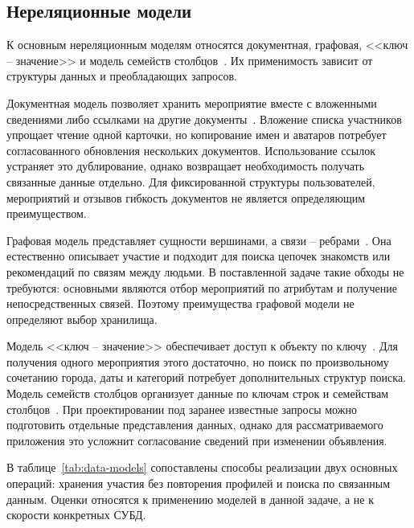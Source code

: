 \subsection{Нереляционные модели}

К основным нереляционным моделям относятся документная, графовая, <<ключ -- значение>> и модель семейств столбцов~\cite{database-types}. Их применимость зависит от структуры данных и преобладающих запросов.

Документная модель позволяет хранить мероприятие вместе с вложенными сведениями либо ссылками на другие документы~\cite{document-model}. Вложение списка участников упрощает чтение одной карточки, но копирование имен и аватаров потребует согласованного обновления нескольких документов. Использование ссылок устраняет это дублирование, однако возвращает необходимость получать связанные данные отдельно. Для фиксированной структуры пользователей, мероприятий и отзывов гибкость документов не является определяющим преимуществом.

Графовая модель представляет сущности вершинами, а связи -- ребрами~\cite{database-types}. Она естественно описывает участие и подходит для поиска цепочек знакомств или рекомендаций по связям между людьми. В поставленной задаче такие обходы не требуются: основными являются отбор мероприятий по атрибутам и получение непосредственных связей. Поэтому преимущества графовой модели не определяют выбор хранилища.

Модель <<ключ -- значение>> обеспечивает доступ к объекту по ключу~\cite{database-types}. Для получения одного мероприятия этого достаточно, но поиск по произвольному сочетанию города, даты и категорий потребует дополнительных структур поиска. Модель семейств столбцов организует данные по ключам строк и семействам столбцов~\cite{database-types}. При проектировании под заранее известные запросы можно подготовить отдельные представления данных, однако для рассматриваемого приложения это усложнит согласование сведений при изменении объявления.

В таблице~\ref{tab:data-models} сопоставлены способы реализации двух основных операций: хранения участия без повторения профилей и поиска по связанным данным. Оценки относятся к применению моделей в данной задаче, а не к скорости конкретных СУБД.

